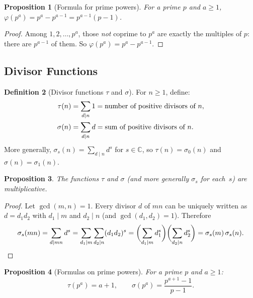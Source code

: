 \documentclass[12pt,a4paper,openany]{book}
\theoremstyle{definition}
\newtheorem{definition}{Definition}[chapter]
\theoremstyle{plain}
\newtheorem{proposition}[definition]{Proposition}
\theoremstyle{remark}
\newcommand{\C}{\mathbb{C}}
\begin{document}
\begin{proposition}[Formula for prime powers]\label{prop:phi-primepower}
For a prime $p$ and $a \ge 1$,
$\varphi(p^a) = p^a - p^{a-1} = p^{a-1}(p-1)$.
\end{proposition}

\begin{proof}
Among $1, 2, \ldots, p^a$, those \emph{not} coprime to $p^a$ are exactly the
multiples of $p$: there are $p^{a-1}$ of them.  So
$\varphi(p^a) = p^a - p^{a-1}$.
\end{proof}

\subsection{Divisor Functions}\label{subsec:divisor-functions}

\begin{definition}[Divisor functions $\tau$ and $\sigma$]\label{def:tau-sigma}
For $n \ge 1$, define:
\begin{align*}
  \tau(n) &= \sum_{d \mid n} 1 = \text{number of positive divisors of } n,
    \index{$\tau(n)$} \\
  \sigma(n) &= \sum_{d \mid n} d = \text{sum of positive divisors of } n.
    \index{$\sigma(n)$}
\end{align*}
More generally, $\sigma_s(n) = \sum_{d\mid n} d^s$ for $s \in \C$,
so $\tau(n) = \sigma_0(n)$ and $\sigma(n) = \sigma_1(n)$.
\end{definition}

\begin{proposition}\label{prop:tau-sigma-mult}
The functions $\tau$ and $\sigma$ (and more generally $\sigma_s$ for each~$s$)
are multiplicative.
\end{proposition}

\begin{proof}
Let $\gcd(m,n)=1$.  Every divisor $d$ of $mn$ can be uniquely written as
$d = d_1 d_2$ with $d_1 \mid m$ and $d_2 \mid n$ (and $\gcd(d_1,d_2)=1$).
Therefore
\[
  \sigma_s(mn) = \sum_{d\mid mn} d^s
               = \sum_{d_1\mid m}\sum_{d_2\mid n} (d_1 d_2)^s
               = \biggl(\sum_{d_1\mid m} d_1^s\biggr)
                 \biggl(\sum_{d_2\mid n} d_2^s\biggr)
               = \sigma_s(m)\,\sigma_s(n). \qedhere
\]
\end{proof}

\begin{proposition}[Formulas on prime powers]\label{prop:tau-sigma-pp}
For a prime $p$ and $a \ge 1$:
\[
  \tau(p^a) = a+1, \qquad
  \sigma(p^a) = \frac{p^{a+1}-1}{p-1}.
\]
\end{proposition}
\end{document}
